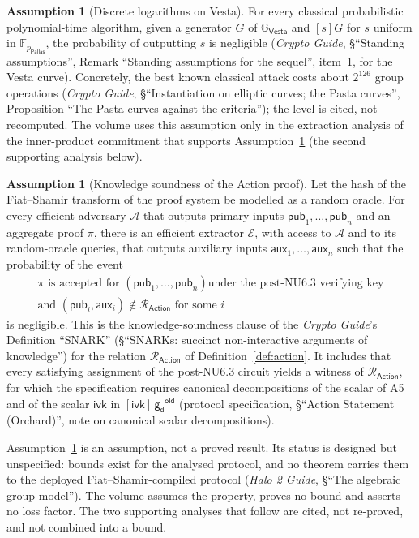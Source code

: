 \documentclass[11pt,a4paper]{article}
\theoremstyle{definition}
\newtheorem{assumption}[theorem]{Assumption}
\newcommand{\F}{\mathbb{F}}
\newcommand{\G}{\mathbb{G}}
\newcommand{\Adv}{\mathcal{A}}
\newcommand{\Ext}{\mathcal{E}}
\newcommand{\Rel}{\mathcal{R}}
\newcommand{\Pallas}{\ensuremath{\mathsf{Pallas}}}
\newcommand{\Vesta}{\ensuremath{\mathsf{Vesta}}}
\newcommand{\ivk}{\ensuremath{\mathsf{ivk}}}
\newcommand{\gd}{\ensuremath{\mathsf{g_d}}}
\begin{document}
\begin{assumption}[Discrete logarithms on Vesta]\label{ass:dl-vesta}
For every classical probabilistic polynomial-time algorithm, given a
generator $G$ of $\G_{\Vesta}$ and $[s]G$ for $s$ uniform in
$\F_{p_{\Pallas}}$, the probability of outputting $s$ is negligible
(\emph{Crypto Guide}, \S``Standing assumptions'', Remark ``Standing
assumptions for the sequel'', item~1, for the Vesta curve). Concretely, the
best known classical attack costs about $2^{126}$ group operations
(\emph{Crypto Guide}, \S``Instantiation on elliptic curves; the Pasta
curves'', Proposition ``The Pasta curves against the criteria''); the level
is cited, not recomputed. The volume uses this assumption only in the
extraction analysis of the inner-product commitment that supports
Assumption~\ref{ass:ks} (the second supporting analysis below).
\end{assumption}

\begin{assumption}[Knowledge soundness of the Action proof]\label{ass:ks}
Let the hash of the Fiat--Shamir transform of the proof system be modelled as
a random oracle. For every efficient adversary $\Adv$ that outputs primary
inputs $\mathsf{pub}_1, \dots, \mathsf{pub}_n$ and an aggregate proof $\pi$,
there is an efficient extractor $\Ext$, with access to $\Adv$ and to its
random-oracle queries, that outputs auxiliary inputs
$\mathsf{aux}_1, \dots, \mathsf{aux}_n$ such that the probability of the
event
\begin{gather*}
  \text{$\pi$ is accepted for $(\mathsf{pub}_1, \dots, \mathsf{pub}_n)$
    under the post-NU6.3 verifying key} \\
  \text{and } (\mathsf{pub}_i, \mathsf{aux}_i) \notin
    \Rel_{\mathsf{Action}} \text{ for some } i
\end{gather*}
is negligible. This is the knowledge-soundness clause of the \emph{Crypto
Guide}'s Definition ``SNARK'' (\S``SNARKs: succinct non-interactive
arguments of knowledge'') for the relation $\Rel_{\mathsf{Action}}$ of
Definition~\ref{def:action}. It includes that every satisfying assignment of
the post-NU6.3 circuit yields a witness of $\Rel_{\mathsf{Action}}$, for
which the specification requires canonical decompositions of the scalar of
A5 and of the scalar $\ivk$ in $[\ivk]\,\gd^{\mathsf{old}}$ (protocol
specification, \S``Action Statement (Orchard)'', note on canonical scalar
decompositions).
\end{assumption}

Assumption~\ref{ass:ks} is an assumption, not a proved result. Its status is
designed but unspecified: bounds exist for the analysed protocol, and no
theorem carries them to the deployed Fiat--Shamir-compiled protocol
(\emph{Halo 2 Guide}, \S``The algebraic group model''). The volume assumes
the property, proves no bound and asserts no loss factor. The two supporting
analyses that follow are cited, not re-proved, and not combined into a bound.
\end{document}
